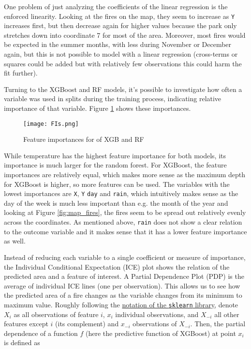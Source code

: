 \documentclass{article}
\begin{document}
One problem of just analyzing the coefficients of the linear regression is the enforced linearity. Looking at the fires on the map, they seem to increase as \texttt{Y} increases first, but then decrease again for higher values because the park only stretches down into coordinate 7 for most of the area. Moreover, most fires would be expected in the summer months, with less during November or December again, but this is not possible to model with a linear regression (cross-terms or squares could be added but with relatively few observations this could harm the fit further).

Turning to the XGBoost and RF models, it's possible to investigate how often a variable was used in splits during the training process, indicating relative importance of that variable. Figure \ref{fig:fis} shows these importances.
\begin{figure}[!htbp]
    \centering
    \texttt{[image: FIs.png]}
    \caption{Feature importances for of XGB and RF}
    \label{fig:fis}
\end{figure}
While temperature has the highest feature importance for both models, its importance is much larger for the random forest. For XGBoost, the feature importances are relatively equal, which makes more sense as the maximum depth for XGBoost is higher, so more features can be used. The variables with the lowest importances are \texttt{X}, \texttt{Y} \texttt{day} and \texttt{rain}, which intuitively makes sense as the day of the week is much less important than e.g. the month of the year and looking at Figure \ref{fig:map_fires}, the fires seem to be spread out relatively evenly across the coordinates. As mentioned above, \texttt{rain} does not show a clear relation to the outcome variable and it makes sense that it has a lower feature importance as well.

Instead of reducing each variable to a single coefficient or measure of importance, the Individual Conditional Expectation (ICE) plot shows the relation of the predicted area and a feature of interest. A Partial Dependence Plot (PDP) is the average of individual ICE lines (one per observation). This allows us to see how the predicted area of a fire changes as the variable changes from its minimum to maximum value. Roughly following the \href{https://scikit-learn.org/stable/modules/partial_dependence.html}{notation of the \texttt{sklearn} library}, denote $X_i$ as all observations of feature $i$, $x_i$ individual observations, and $X_{-i}$ all other features except $i$ (its complement) and $x_{-i}$ observations of $X_{-i}$. Then, the partial dependence of a function $f$ (here the predictive function of XGBoost) at point $x_i$ is defined as
\end{document}

